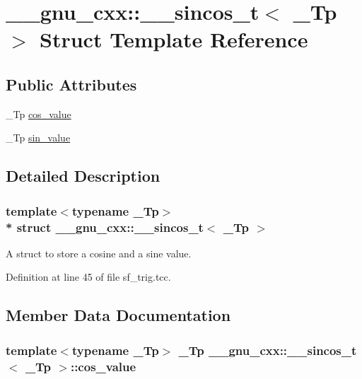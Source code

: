 \hypertarget{struct____gnu__cxx_1_1____sincos__t}{}\section{\+\_\+\+\_\+gnu\+\_\+cxx\+:\+:\+\_\+\+\_\+sincos\+\_\+t$<$ \+\_\+\+Tp $>$ Struct Template Reference}
\label{struct____gnu__cxx_1_1____sincos__t}
\subsection*{Public Attributes}
\begin{DoxyCompactItemize}
\item 
\+\_\+\+Tp \hyperlink{struct____gnu__cxx_1_1____sincos__t_a7bd05f866e4b6ad9ffd83f6a2eb01595}{cos\+\_\+value}
\item 
\+\_\+\+Tp \hyperlink{struct____gnu__cxx_1_1____sincos__t_aeff58997312089a3abd6b71abe722fc8}{sin\+\_\+value}
\end{DoxyCompactItemize}


\subsection{Detailed Description}
\subsubsection*{template$<$typename \+\_\+\+Tp$>$\\*
struct \+\_\+\+\_\+gnu\+\_\+cxx\+::\+\_\+\+\_\+sincos\+\_\+t$<$ \+\_\+\+Tp $>$}

A struct to store a cosine and a sine value. 

Definition at line 45 of file sf\+\_\+trig.\+tcc.



\subsection{Member Data Documentation}
\subsubsection[{\texorpdfstring{cos\+\_\+value}{cos_value}}]{\setlength{\rightskip}{0pt plus 5cm}template$<$typename \+\_\+\+Tp$>$ \+\_\+\+Tp {\bf \+\_\+\+\_\+gnu\+\_\+cxx\+::\+\_\+\+\_\+sincos\+\_\+t}$<$ \+\_\+\+Tp $>$\+::cos\+\_\+value}\hypertarget{struct____gnu__cxx_1_1____sincos__t_a7bd05f866e4b6ad9ffd83f6a2eb01595}{}\label{struct____gnu__cxx_1_1____sincos__t_a7bd05f866e4b6ad9ffd83f6a2eb01595}


